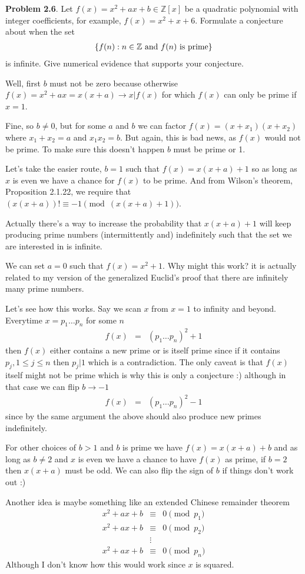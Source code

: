 \documentclass[aps,preprint,preprintnumbers,nofootinbib,showpacs,prd]{revtex4-1}
\newcommand{\nbea}{\begin{eqnarray*}}
\newcommand{\neea}{\end{eqnarray*}}
\begin{document}
{\bf Problem 2.6}.  Let $f(x) = x^2 +ax+b \in \mathbb{Z}[x]$ be a quadratic polynomial with integer
coefficients, for example, $f(x) = x^2 + x + 6$. Formulate a conjecture about when the set
%
\nbea
\{f(n) : n \in \mathbb{Z} {\rm ~and~} f(n) {\rm ~is~ prime}\}
\neea
%
is infinite. Give numerical evidence that supports your conjecture.

Well, first $b$ must not be zero because otherwise $f(x) = x^2 + ax = x(x+a) \to x|f(x)$ for which $f(x)$ can only be prime if $x=1$.

Fine, so $b \neq 0$, but for some $a$ and $b$ we can factor $f(x) = (x + x_1)(x + x_2)$ where $x_1 + x_2 = a$ and $x_1x_2 = b$. But again, this is bad news, as $f(x)$ would not be prime. To make sure this doesn't happen $b$ must be prime or 1.

Let's take the easier route, $b=1$ such that $f(x) = x(x+a) + 1$ so as long as $x$ is even we have a chance for $f(x)$ to be prime. And from Wilson's theorem, Proposition 2.1.22, we require that $(x(x+a))! \equiv -1 \pmod{(x(x+a)+1)}$.

Actually there's a way to increase the probability that $x(x+a) + 1$ will keep producing prime numbers (intermittently and) indefinitely such that the set we are interested in is infinite.

We can set $a=0$ such that $f(x) = x^2 + 1$. Why might this work? it is actually related to my version of the generalized Euclid's proof that there are infinitely many prime numbers.

Let's see how this works. Say we scan $x$ from $x=1$ to infinity and beyond. Everytime $x = p_1 \dots p_n$ for some $n$
%
\nbea
f(x) & = & (p_1 \dots p_n)^2 + 1
\neea
%
then $f(x)$ either contains a new prime or is itself prime since if it contains $p_j, 1 \le j \le n$ then $p_j|1$ which is a contradiction. The only caveat is that $f(x)$ itself might not be prime which is why this is only a conjecture :) although in that case we can flip $b \to -1$
%
\nbea
f(x) & = & (p_1 \dots p_n)^2 - 1
\neea
%
since by the same argument the above should also produce new primes indefinitely.

For other choices of $b > 1$ and $b$ is prime we have $f(x) = x(x+a) + b$ and as long as $b \neq 2$ and $x$ is even we have a chance to have $f(x)$ as prime, if $b = 2$ then $x(x+a)$ must be odd. We can also flip the sign of $b$ if things don't work out :)

Another idea is maybe something like an extended Chinese remainder theorem
%
\nbea
x^2 + ax + b & \equiv & 0 \pmod{p_1} \\
x^2 + ax + b & \equiv & 0 \pmod{p_2} \\
& \vdots & \\
x^2 + ax + b & \equiv & 0 \pmod{p_n}
\neea
%
Although I don't know how this would work since $x$ is squared.
\end{document}
